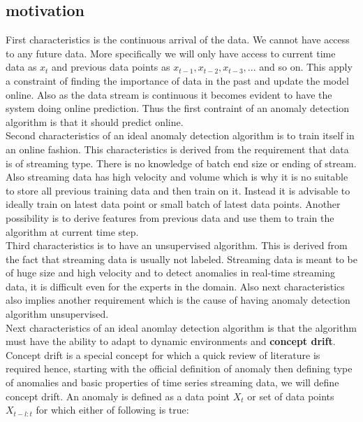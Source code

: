 \documentclass[12pt]{article}
\begin{document}
\subsection{motivation}
First characteristics is the continuous arrival of the data. We cannot have access to any future data. More specifically we will only have access to current time data as $x_t$ and previous data points as $x_{t-1},x_{t-2},x_{t-3},...$ and so on. This apply a constraint of finding the importance of data in the past and update the model online. Also as the data stream is continuous it becomes evident to have the system doing online prediction. Thus the first contraint of an anomaly detection algorithm is that it should predict online. \\
\break
Second characteristics of an ideal anomaly detection algorithm is to train itself in an online fashion. This characteristics is derived from the requirement that data is of streaming type. There is no knowledge of batch end size or ending of stream. Also streaming data has high velocity and volume which is why it is no suitable to store all previous training data and then train on it. Instead it is advisable to ideally train on latest data point or small batch of latest data points. Another possibility is to derive features from previous data and use them to train the algorithm at current time step. \\
\break
Third characteristics is to have an unsupervised algorithm. This is derived from the fact that streaming data is usually not labeled. Streaming data is meant to be of huge size and high velocity and to detect anomalies in real-time streaming data, it is difficult even for the experts in the domain. Also next characteristics also implies another requirement which is the cause of having anomaly detection algorithm unsupervised. \\
\break
Next characteristics of an ideal anomlay detection algorithm is that the algorithm must have the ability to adapt to dynamic environments and \textbf{concept drift}. Concept drift is a special concept for which a quick review of literature is required hence, starting with the official definition of anomaly then defining type of anomalies and basic properties of time series streaming data, we will define concept drift.
\newpage
An anomaly is defined as a data point $X_t$ or set of data points $X_{t-l:t}$ for which either of following is true:
\end{document}
